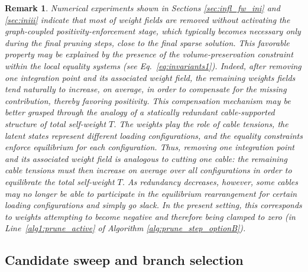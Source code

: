 \documentclass[preprint,10pt]{elsarticle}  %
\newtheorem{remark}{Remark}
\newcommand{\MATLAB}[1]{ }
\begin{document}
\begin{remark}
\label{remark:positive}
 Numerical experiments shown in Sections \ref{sec:infl_fw_ini} and \ref{sec:iniii} indicate that most  of weight fields
  are removed without activating the graph-coupled
positivity-enforcement stage, which typically becomes necessary only
during the final pruning steps, close to the final sparse solution. This favorable property may be explained by the presence of
the volume-preservation constraint within the local equality systems
(see Eq.~\ref{eq:invariants1}). Indeed, after removing one integration point and its associated weight
field, the remaining weights fields tend naturally to increase, on average,  in order to
compensate for the missing contribution, thereby favoring positivity. This compensation
mechanism may be better grasped through the analogy of a statically
redundant cable-supported structure of total self-weight \(T\). The  weights play the role of cable
tensions, the latent states represent different loading configurations,
and the equality constraints enforce equilibrium for each configuration.
Thus,
removing one integration point and its associated weight field is
analogous to cutting one cable: the remaining cable tensions must then
increase on average over all configurations  in order to equilibrate the total self-weight $T$. As redundancy
decreases, however, some cables may no longer be able to participate in
the equilibrium rearrangement for certain loading configurations and
simply go slack. In the present setting, this corresponds to weights
attempting to become negative and therefore being clamped to zero (in Line~\ref{alg1:prune_active} of Algorithm \ref{alg:prune_step_optionB}).
\end{remark}







%
%





\subsection{Candidate sweep and branch selection}
\label{sec:candidatesweepbranch}
\end{document}
